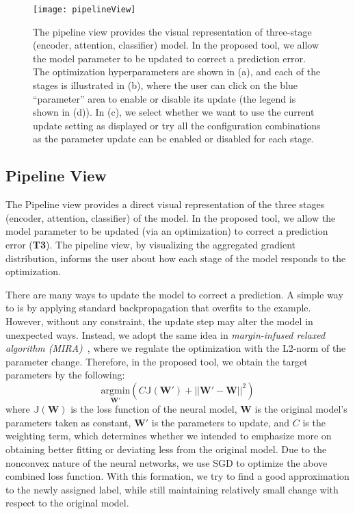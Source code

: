\begin{figure}[htbp]
\centering
\vspace{-2mm}
 \texttt{[image: pipelineView]}
 \vspace{-3mm}
 \caption{
The pipeline view provides the visual representation of three-stage (encoder, attention, classifier) model. 
In the proposed tool, we allow the model parameter to be updated to correct a prediction error. 
The optimization hyperparameters are shown in (a), and each of the stages is illustrated in (b), where the user can click on the blue ``parameter'' area to enable or disable its update (the legend is shown in (d)). In (c), we select whether we want to use the current update setting as displayed or try all the configuration combinations as the parameter update can be enabled or disabled for each stage.
 }
\label{fig:pipelineView}
\vspace{-2mm}
\end{figure}

\subsection{Pipeline View}
\label{sec:pipeline}
The Pipeline view provides a direct visual representation of the three stages (encoder, attention, classifier) of the model. In the proposed tool, we allow the model parameter to be updated (via an optimization) to correct a prediction error (\textbf{T3}). The pipeline view, by visualizing the aggregated gradient distribution, informs the user about how each stage of the model responds to the optimization.

There are many ways to update the model to correct a prediction. A simple way to is by applying standard backpropagation that overfits to the example. However, without any constraint, the update step may alter the model in unexpected ways.
Instead, we adopt the same idea in \emph{margin-infused relaxed algorithm (MIRA)}~\cite{CrammerSinger2003}, where we regulate the optimization with the L2-norm of the parameter change. Therefore, in the proposed tool, we obtain the target parameters by the following:
\begin{equation}
\underset{\mathbf{W}'}{\mathrm{argmin}}( C \mathbb{J}(\mathbf{W}') + ||\mathbf{W}' - \mathbf{W}||^2)
\end{equation}
where $\mathbb{J}(\mathbf{W})$ is the loss function of the neural model, $\mathbf{W}$ is the original model's parameters taken as constant, $\mathbf{W}'$ is the parameters to update, and $C$ is the weighting term, which determines whether we intended to emphasize more on obtaining better fitting or deviating less from the original model. Due to the nonconvex nature of the neural networks, we use SGD to optimize the above combined loss function.
%
With this formation, we try to find a good approximation to the newly assigned label, while still maintaining relatively small change with respect to the original model.

